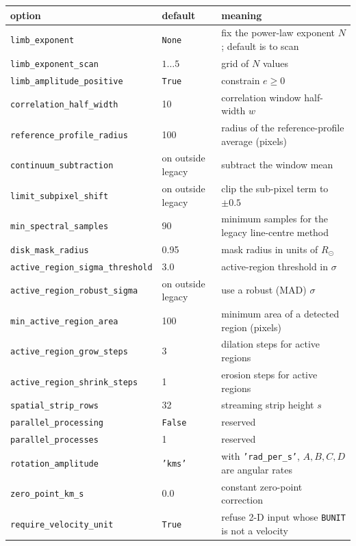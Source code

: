 \documentclass[11pt,a4paper]{article}
\newcommand{\code}[1]{\texttt{\small #1}}
\newcommand{\Rsun}{R_{\odot}}
\begin{document}
\begin{longtable}{@{}lll@{}}
\toprule
option & default & meaning \\
\midrule
\endhead
\code{limb\_exponent}             & \code{None} & fix the power-law exponent $N$; default is to scan \\
\code{limb\_exponent\_scan}       & $1\ldots5$  & grid of $N$ values \\
\code{limb\_amplitude\_positive}  & \code{True} & constrain $e\ge0$ \\
\code{correlation\_half\_width}   & 10 & correlation window half-width $w$ \\
\code{reference\_profile\_radius} & 100 & radius of the reference-profile average (pixels) \\
\code{continuum\_subtraction}     & on outside legacy & subtract the window mean \\
\code{limit\_subpixel\_shift}     & on outside legacy & clip the sub-pixel term to $\pm0.5$ \\
\code{min\_spectral\_samples}     & 90 & minimum samples for the legacy line-centre method \\
\code{disk\_mask\_radius}         & 0.95 & mask radius in units of $\Rsun$ \\
\code{active\_region\_sigma\_threshold} & 3.0 & active-region threshold in $\sigma$ \\
\code{active\_region\_robust\_sigma}    & on outside legacy & use a robust (MAD) $\sigma$ \\
\code{min\_active\_region\_area}  & 100 & minimum area of a detected region (pixels) \\
\code{active\_region\_grow\_steps}   & 3 & dilation steps for active regions \\
\code{active\_region\_shrink\_steps} & 1 & erosion steps for active regions \\
\code{spatial\_strip\_rows}       & 32 & streaming strip height $s$ \\
\code{parallel\_processing}       & \code{False} & reserved \\
\code{parallel\_processes}        & 1 & reserved \\
\code{rotation\_amplitude}        & \code{'kms'} & with \code{'rad\_per\_s'}, $A,B,C,D$ are angular rates \\
\code{zero\_point\_km\_s}         & 0.0 & constant zero-point correction \\
\code{require\_velocity\_unit}    & \code{True} & refuse 2-D input whose \code{BUNIT} is not a velocity \\
\bottomrule
\end{longtable}
\end{document}
